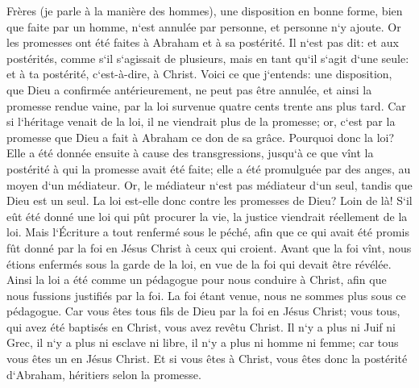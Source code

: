 \verse Frères (je parle à la manière des hommes), une disposition en bonne forme, bien que faite par un homme, n`est annulée par personne, et personne n`y ajoute. 
\verse Or les promesses ont été faites à Abraham et à sa postérité. Il n`est pas dit: et aux postérités, comme s`il s`agissait de plusieurs, mais en tant qu`il s`agit d`une seule: et à ta postérité, c`est-à-dire, à Christ. 
\verse Voici ce que j`entends: une disposition, que Dieu a confirmée antérieurement, ne peut pas être annulée, et ainsi la promesse rendue vaine, par la loi survenue quatre cents trente ans plus tard. 
\verse Car si l`héritage venait de la loi, il ne viendrait plus de la promesse; or, c`est par la promesse que Dieu a fait à Abraham ce don de sa grâce. 
\verse Pourquoi donc la loi? Elle a été donnée ensuite à cause des transgressions, jusqu`à ce que vînt la postérité à qui la promesse avait été faite; elle a été promulguée par des anges, au moyen d`un médiateur. 
\verse Or, le médiateur n`est pas médiateur d`un seul, tandis que Dieu est un seul. 
\verse La loi est-elle donc contre les promesses de Dieu? Loin de là! S`il eût été donné une loi qui pût procurer la vie, la justice viendrait réellement de la loi. 
\verse Mais l`Écriture a tout renfermé sous le péché, afin que ce qui avait été promis fût donné par la foi en Jésus Christ à ceux qui croient. 
\verse Avant que la foi vînt, nous étions enfermés sous la garde de la loi, en vue de la foi qui devait être révélée. 
\verse Ainsi la loi a été comme un pédagogue pour nous conduire à Christ, afin que nous fussions justifiés par la foi. 
\verse La foi étant venue, nous ne sommes plus sous ce pédagogue. 
\verse Car vous êtes tous fils de Dieu par la foi en Jésus Christ; 
\verse vous tous, qui avez été baptisés en Christ, vous avez revêtu Christ. 
\verse Il n`y a plus ni Juif ni Grec, il n`y a plus ni esclave ni libre, il n`y a plus ni homme ni femme; car tous vous êtes un en Jésus Christ. 
\verse Et si vous êtes à Christ, vous êtes donc la postérité d`Abraham, héritiers selon la promesse. 

